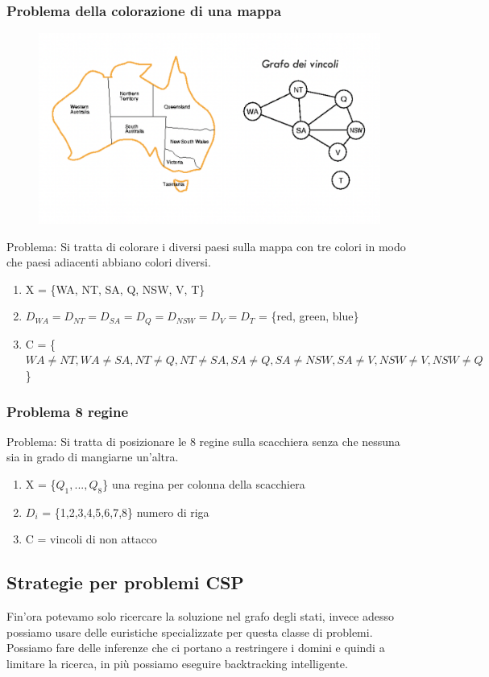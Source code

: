 \documentclass{article}
\begin{document}
\subsubsection{Problema della colorazione di una mappa}
\begin{figure}[H]
\centering
\includegraphics[scale=0.35]{Images/mappacolorata.png}
\end{figure}
Problema: Si tratta di colorare i diversi paesi sulla mappa con tre colori in modo che paesi adiacenti abbiano colori diversi.
\begin{enumerate}
    \item X = \{WA, NT, SA, Q, NSW, V, T\}
    \item $D_{WA} = D_{NT} = D_{SA} = D_Q = D_{NSW} = D_{V} = D_T$ = \{red, green, blue\}
    \item C = \{$WA \neq NT, WA \neq SA, NT \neq Q, NT \neq SA, SA \neq Q, SA \neq NSW, SA \neq V, NSW \neq V, NSW \neq Q$\}
\end{enumerate}

\subsubsection{Problema 8 regine}
Problema: Si tratta di posizionare le 8 regine sulla scacchiera senza che nessuna sia in grado di mangiarne un'altra.
\begin{enumerate}
    \item X = \{$Q_1, ..., Q_8$\} \quad una regina per colonna della scacchiera
    \item $D_i$ = \{1,2,3,4,5,6,7,8\} \quad numero di riga
    \item C = vincoli di non attacco
\end{enumerate}

\subsection{Strategie per problemi CSP}
Fin'ora potevamo solo ricercare la soluzione nel grafo degli stati, invece adesso possiamo usare delle euristiche specializzate per questa classe di problemi. Possiamo fare delle inferenze che ci portano a restringere i domini e quindi a limitare la ricerca, in più possiamo eseguire backtracking intelligente.
\end{document}
